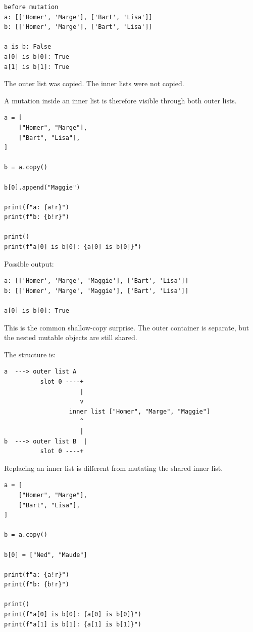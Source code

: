 \begin{verbatim}
before mutation
a: [['Homer', 'Marge'], ['Bart', 'Lisa']]
b: [['Homer', 'Marge'], ['Bart', 'Lisa']]

a is b: False
a[0] is b[0]: True
a[1] is b[1]: True
\end{verbatim}

The outer list was copied. The inner lists were not copied.

A mutation inside an inner list is therefore visible through both outer lists.

\begin{verbatim}
a = [
    ["Homer", "Marge"],
    ["Bart", "Lisa"],
]

b = a.copy()

b[0].append("Maggie")

print(f"a: {a!r}")
print(f"b: {b!r}")

print()
print(f"a[0] is b[0]: {a[0] is b[0]}")
\end{verbatim}

Possible output:

\begin{verbatim}
a: [['Homer', 'Marge', 'Maggie'], ['Bart', 'Lisa']]
b: [['Homer', 'Marge', 'Maggie'], ['Bart', 'Lisa']]

a[0] is b[0]: True
\end{verbatim}

This is the common shallow-copy surprise. The outer container is separate, but the nested mutable objects are still shared.

The structure is:

\begin{verbatim}
a  ---> outer list A
          slot 0 ----+
                     |
                     v
                  inner list ["Homer", "Marge", "Maggie"]
                     ^
                     |
b  ---> outer list B  |
          slot 0 ----+
\end{verbatim}

Replacing an inner list is different from mutating the shared inner list.

\begin{verbatim}
a = [
    ["Homer", "Marge"],
    ["Bart", "Lisa"],
]

b = a.copy()

b[0] = ["Ned", "Maude"]

print(f"a: {a!r}")
print(f"b: {b!r}")

print()
print(f"a[0] is b[0]: {a[0] is b[0]}")
print(f"a[1] is b[1]: {a[1] is b[1]}")
\end{verbatim}

